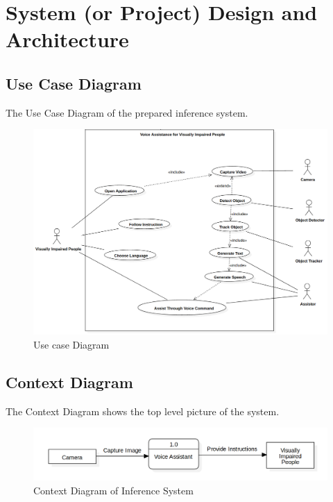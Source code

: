\chapter{System (or Project) Design and Architecture}
    \section{Use Case Diagram}
    The Use Case Diagram of the prepared inference system.
        \begin{figure}[h]
        \centering
            \includegraphics[width=1.0\textwidth]{img/Final_UseCase.png}
            \caption{Use case Diagram}    
        \end{figure}
    \pagebreak
    \section{Context Diagram}
    The Context Diagram shows the top level picture of the system.
    \begin{figure}[h]
            \centering
                \includegraphics[width=1.0\textwidth]{img/context_Diagram.png}
                \caption{Context Diagram of Inference System}    
            \end{figure}
